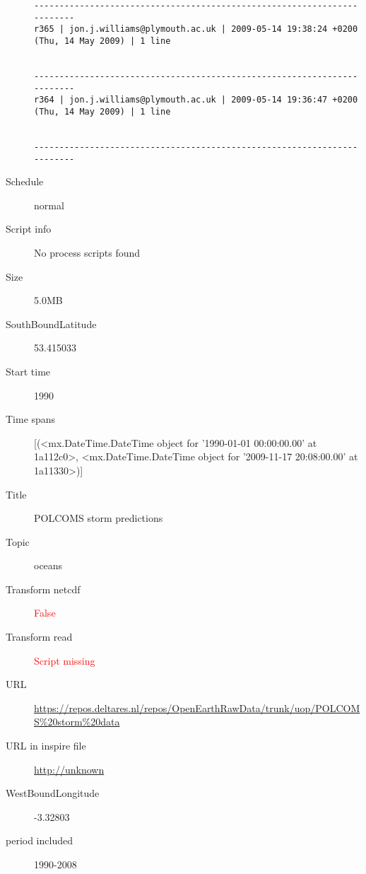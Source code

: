 \documentclass[9]{report}
\begin{document}
\begin{description}
\begin{verbatim}
------------------------------------------------------------------------
r365 | jon.j.williams@plymouth.ac.uk | 2009-05-14 19:38:24 +0200 (Thu, 14 May 2009) | 1 line


------------------------------------------------------------------------
r364 | jon.j.williams@plymouth.ac.uk | 2009-05-14 19:36:47 +0200 (Thu, 14 May 2009) | 1 line


------------------------------------------------------------------------

\end{verbatim}
  \item[Schedule] normal
  \item[Script info] No process scripts found
  \item[Size] 5.0MB
  \item[SouthBoundLatitude] 53.415033
  \item[Start time] 1990
  \item[Time spans] [(<mx.DateTime.DateTime object for '1990-01-01 00:00:00.00' at 1a112c0>, <mx.DateTime.DateTime object for '2009-11-17 20:08:00.00' at 1a11330>)]
  \item[Title]  POLCOMS storm predictions 
  \item[Topic] oceans
  \item[Transform netcdf] \textcolor{red}{False}
  \item[Transform read] \textcolor{red}{Script missing}
  \item[URL] \href{https://repos.deltares.nl/repos/OpenEarthRawData/trunk/uop/POLCOMS\%20storm\%20data}{https://repos.deltares.nl/repos/OpenEarthRawData/trunk/uop/POLCOMS\%20storm\%20data}
  \item[URL in inspire file] \href{http://unknown}{http://unknown}
  \item[WestBoundLongitude] -3.32803
  \item[period included] 1990-2008
\end{description}
\end{document}
